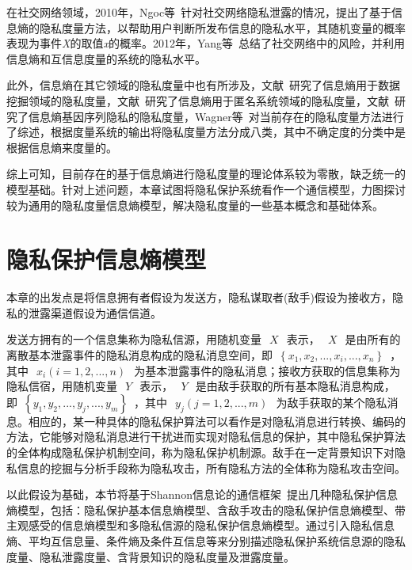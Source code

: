 在社交网络领域，2010年，Ngoc等~\cite{ngoc2010new}针对社交网络隐私泄露的情况，提出了基于信息熵的隐私度量方法，以帮助用户判断所发布信息的隐私水平，其随机变量的概率表现为事件\textit{X}的取值\textit{x}的概率。2012年，Yang等~\cite{yang2012stalking}总结了社交网络中的风险，并利用信息熵和互信息度量的系统的隐私水平。

此外，信息熵在其它领域的隐私度量中也有所涉及，文献~\cite{agrawal2001design,zhan2007quantifying}研究了信息熵用于数据挖掘领域的隐私度量，文献~\cite{edman2007combinatorial}研究了信息熵用于匿名系统领域的隐私度量，文献~\cite{wagner2017evaluating}研究了信息熵基因序列隐私的隐私度量，Wagner等~\cite{wagner2018technical}对当前存在的隐私度量方法进行了综述，根据度量系统的输出将隐私度量方法分成八类，其中不确定度的分类中是根据信息熵来度量的。

综上可知，目前存在的基于信息熵进行隐私度量的理论体系较为零散，缺乏统一的模型基础。针对上述问题，本章试图将隐私保护系统看作一个通信模型，力图探讨较为通用的隐私度量信息熵模型，解决隐私度量的一些基本概念和基础体系。

\section{隐私保护信息熵模型}\label{sec:Entropy model of privacy protection information}

本章的出发点是将信息拥有者假设为发送方，隐私谋取者(敌手)假设为接收方，隐私的泄露渠道假设为通信信道。

发送方拥有的一个信息集称为隐私信源，用随机变量~$~X~$~表示，~$~X~$~是由所有的离散基本泄露事件的隐私消息构成的隐私消息空间，即~$\left \{ x_{1},x_{2},...,x_{i},...,x_{n} \right \}$~，其中~$~x_{i}(i=1,2,...,n)~$~为基本泄露事件的隐私消息；接收方获取的信息集称为隐私信宿，用随机变量~$~Y~$~表示，~$~Y~$~是由敌手获取的所有基本隐私消息构成，即~$\left \{y_{1},y_{2},...,y_{j},...,y_{m} \right \}$~，其中~$~y_{j}(j=1,2,...,m)~$~为敌手获取的某个隐私消息。相应的，某一种具体的隐私保护算法可以看作是对隐私消息进行转换、编码的方法，它能够对隐私消息进行干扰进而实现对隐私信息的保护，其中隐私保护算法的全体构成隐私保护机制空间，称为隐私保护机制源。敌手在一定背景知识下对隐私信息的挖掘与分析手段称为隐私攻击，所有隐私方法的全体称为隐私攻击空间。

以此假设为基础，本节将基于Shannon信息论的通信框架~\cite{stone2018information}提出几种隐私保护信息熵模型，包括：隐私保护基本信息熵模型、含敌手攻击的隐私保护信息熵模型、带主观感受的信息熵模型和多隐私信源的隐私保护信息熵模型。通过引入隐私信息熵、平均互信息量、条件熵及条件互信息等来分别描述隐私保护系统信息源的隐私度量、隐私泄露度量、含背景知识的隐私度量及泄露度量。

